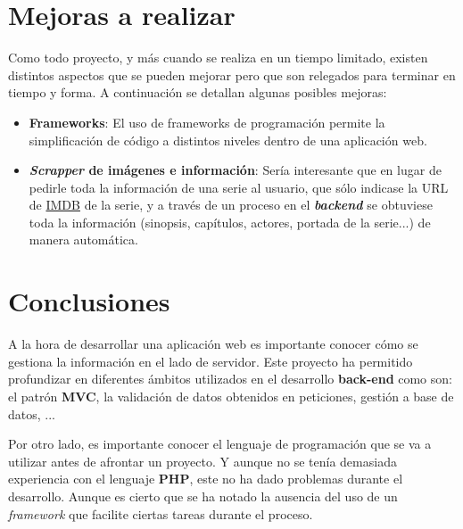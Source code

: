 \documentclass{\ClassPath/viu-tfm-template}
\begin{document}
\chapter{Mejoras a realizar}
Como todo proyecto, y más cuando se realiza en un tiempo limitado, existen distintos aspectos que se pueden mejorar pero que son relegados para terminar en tiempo y forma. A continuación se detallan algunas posibles mejoras:

\vspace{-1em}
\begin{itemize}
    \item \textbf{Frameworks}: El uso de frameworks de programación permite la simplificación de código a distintos niveles dentro de una aplicación web.
    \item \textbf{\textit{Scrapper} de imágenes e información}: Sería interesante que en lugar de pedirle toda la información de una serie al usuario, que sólo indicase la URL de \href{https://www.imdb.com/}{IMDB} de la serie, y a través de un proceso en el \textbf{\textit{backend}} se obtuviese toda la información (sinopsis, capítulos, actores, portada de la serie...) de manera automática.
\end{itemize}


\chapter{Conclusiones}

A la hora de desarrollar una aplicación web es importante conocer cómo se gestiona la información en el lado de servidor. Este proyecto ha permitido profundizar en diferentes ámbitos utilizados en el desarrollo \textbf{back-end} como son: el patrón \textbf{MVC}, la validación de datos obtenidos en peticiones, gestión a base de datos, ...

Por otro lado, es importante conocer el lenguaje de programación que se va a utilizar antes de afrontar un proyecto. Y aunque no se tenía demasiada experiencia con el lenguaje \textbf{PHP}, este no ha dado problemas durante el desarrollo. Aunque es cierto que se ha notado la ausencia del uso de un \textit{framework} que facilite ciertas tareas durante el proceso.
\end{document}
